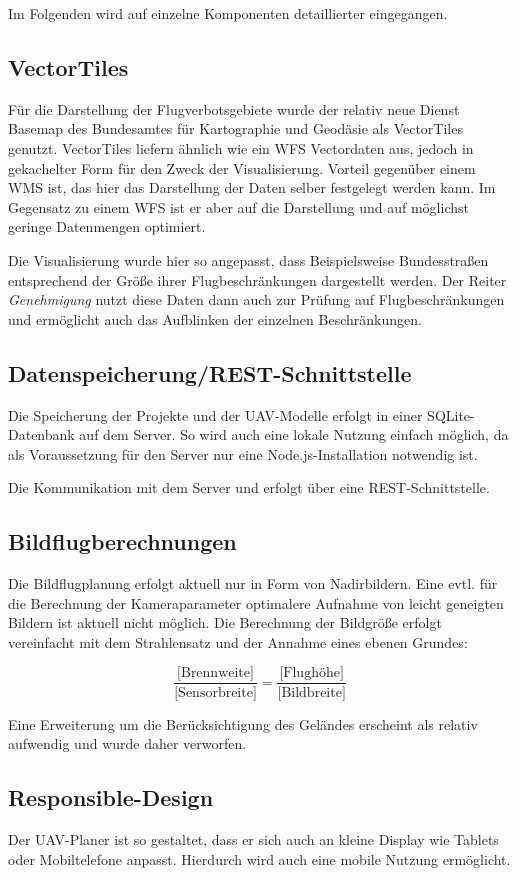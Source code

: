 \documentclass[a4paper,12pt,bibliography=totoc, listof=totoc,titlepage]{scrartcl}
\begin{document}
Im Folgenden wird auf einzelne Komponenten detaillierter eingegangen.

\subsection{VectorTiles}
Für die Darstellung der Flugverbotsgebiete wurde der relativ neue Dienst Basemap des Bundesamtes für Kartographie und Geodäsie als VectorTiles genutzt. VectorTiles liefern ähnlich wie ein WFS Vectordaten aus, jedoch in gekachelter Form für den Zweck der Visualisierung. Vorteil gegenüber einem WMS ist, das hier das Darstellung der Daten selber festgelegt werden kann. Im Gegensatz zu einem WFS ist er aber auf die Darstellung und auf möglichst geringe Datenmengen optimiert.

Die Visualisierung wurde hier so angepasst, dass Beispielsweise Bundesstraßen entsprechend der Größe ihrer Flugbeschränkungen dargestellt werden. Der Reiter \textit{Genehmigung} nutzt diese Daten dann auch zur Prüfung auf Flugbeschränkungen und ermöglicht auch das Aufblinken der einzelnen Beschränkungen.

\subsection{Datenspeicherung/REST-Schnittstelle}
Die Speicherung der Projekte und der UAV-Modelle erfolgt in einer SQLite-Datenbank auf dem Server. So wird auch eine lokale Nutzung einfach möglich, da als Voraussetzung für den Server nur eine Node.js-Installation notwendig ist.

Die Kommunikation mit dem Server und erfolgt über eine REST-Schnittstelle.

\subsection{Bildflugberechnungen}
Die Bildflugplanung erfolgt aktuell nur in Form von Nadirbildern. Eine evtl. für die Berechnung der Kameraparameter optimalere Aufnahme \citep{opendronemap}  von leicht geneigten Bildern ist aktuell nicht möglich. Die Berechnung der Bildgröße erfolgt vereinfacht mit dem Strahlensatz und der Annahme eines ebenen Grundes:

\begin{equation*}
    \frac{\text{[Brennweite]}}{\text{[Sensorbreite]}} =  \frac{\text{[Flughöhe]}}{\text{[Bildbreite]}} 
\end{equation*}

Eine Erweiterung um die Berücksichtigung des Geländes erscheint als relativ aufwendig und wurde daher verworfen.

\subsection{Responsible-Design}
Der UAV-Planer ist so gestaltet, dass er sich auch an kleine Display wie Tablets oder Mobiltelefone anpasst. Hierdurch wird auch eine mobile Nutzung ermöglicht.

\clearpage
\renewcommand\UrlFont\itshape
\renewcommand{\refname}{Literaturverzeichnis}

\listoffigures
\end{document}
